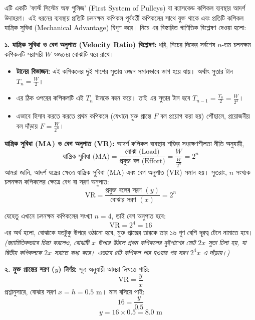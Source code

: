 \documentclass[12pt, a4paper]{article}
\begin{document}
{%
\begin{tcolorbox}[solutionbox={সমাধান (Solution)}]
\noindent
এটি একটি 'ফার্স্ট সিস্টেম অফ পুলিজ' (First System of Pulleys) বা ক্যাসকেড কপিকল ব্যবস্থার আদর্শ উদাহরণ। এই ধরনের ব্যবস্থায় প্রতিটি চলনক্ষম কপিকল পূর্ববর্তী কপিকলের সাথে যুক্ত থাকে এবং প্রতিটি কপিকল যান্ত্রিক সুবিধা (Mechanical Advantage) দ্বিগুণ করে। নিচে এর বিস্তারিত গাণিতিক বিশ্লেষণ দেওয়া হলো:

\vspace{0.5em}
\textbf{১. যান্ত্রিক সুবিধা ও বেগ অনুপাত (Velocity Ratio) বিশ্লেষণ:}
ধরি, নিচের দিকের সর্বশেষ $n$-তম চলনক্ষম কপিকলটি সরাসরি $W$ ওজনের বোঝাটি ধরে রাখে। 
\begin{itemize}[leftmargin=1.5em, itemsep=0.2em]
    \item \textbf{টানের বিভাজন:} এই কপিকলের দুই পাশের সুতায় ওজন সমানভাবে ভাগ হয়ে যায়। অর্থাৎ সুতার টান $T_n = \frac{W}{2}$।
    \item এর ঠিক ওপরের কপিকলটি এই $T_n$ টানকে বহন করে। তাই এর সুতার টান হবে $T_{n-1} = \frac{T_n}{2} = \frac{W}{2^2}$।
    \item এভাবে হিসাব করতে করতে প্রথম কপিকলে (যেখানে মুক্ত প্রান্তে $F$ বল প্রয়োগ করা হয়) পৌঁছালে, প্রয়োজনীয় বল দাঁড়ায় $F = \frac{W}{2^n}$।
\end{itemize}

\textbf{যান্ত্রিক সুবিধা (MA) ও বেগ অনুপাত (VR):}
আদর্শ কপিকল ব্যবস্থায় শক্তির সংরক্ষণশীলতা নীতি অনুযায়ী,
$$\text{যান্ত্রিক সুবিধা (MA)} = \frac{\text{বোঝা (Load)}}{\text{প্রযুক্ত বল (Effort)}} = \frac{W}{\frac{W}{2^n}} = 2^n$$
আমরা জানি, আদর্শ যন্ত্রের ক্ষেত্রে যান্ত্রিক সুবিধা (MA) এবং বেগ অনুপাত (VR) সমান হয়। সুতরাং, $n$ সংখ্যক চলনক্ষম কপিকলের ক্ষেত্রে বেগ বা সরণ অনুপাত:
$$\text{VR} = \frac{\text{প্রযুক্ত বলের সরণ }(y)}{\text{বোঝার সরণ }(x)} = 2^n$$

যেহেতু এখানে চলনক্ষম কপিকলের সংখ্যা $n = 4$, তাই বেগ অনুপাত হবে:
$$\text{VR} = 2^4 = 16$$
এর অর্থ হলো, বোঝাকে যতটুকু উপরে ওঠানো হবে, মুক্ত প্রান্তের তারকে তার ১৬ গুণ বেশি দূরত্ব টেনে নামাতে হবে। \textit{(জ্যামিতিকভাবে চিন্তা করলেও, বোঝাটি $x$ উপরে উঠলে প্রথম কপিকলের দুইপাশের মোট $2x$ সুতা ঢিলা হয়, যা দ্বিতীয় কপিকলকে $2x$ সরাতে বাধ্য করে। এভাবে ৪টি কপিকল পার হওয়ার পর সরণ $2^4 x$ এ দাঁড়ায়।)}

\vspace{0.5em}
\textbf{২. মুক্ত প্রান্তের সরণ ($y$) নির্ণয়:}
সূত্র অনুযায়ী আমরা লিখতে পারি:
$$\text{VR} = \frac{y}{x}$$
প্রশ্নানুসারে, বোঝার সরণ $x = h = 0.5\text{ m}$। মান বসিয়ে পাই:
$$16 = \frac{y}{0.5}$$
$$y = 16 \times 0.5 = 8.0\text{ m}$$


\end{tcolorbox}}
\end{document}
